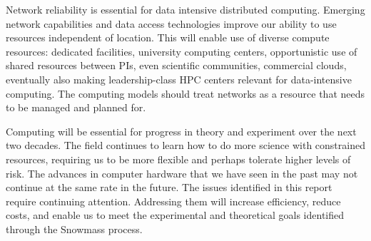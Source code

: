 Network reliability is essential for data intensive distributed computing.
Emerging network capabilities and data access technologies improve our
ability to use resources independent of location. This will enable use of
diverse compute resources: dedicated facilities, university computing
centers, opportunistic use of shared resources between PIs, even scientific
communities, commercial clouds, eventually also making leadership-class HPC
centers relevant for data-intensive computing. The computing models should
treat networks as a resource that needs to be managed and planned for.

Computing will be essential for progress in theory and experiment over the
next two decades. The field continues to learn how to do more science with
constrained resources, requiring us to be more flexible and perhaps tolerate
higher levels of risk. The advances in computer hardware that we have seen
in the past may not continue at the same rate in the future. The issues
identified in this report require continuing attention. Addressing them
will increase efficiency, reduce costs, and enable us to meet the
experimental and theoretical goals identified through the Snowmass process.

